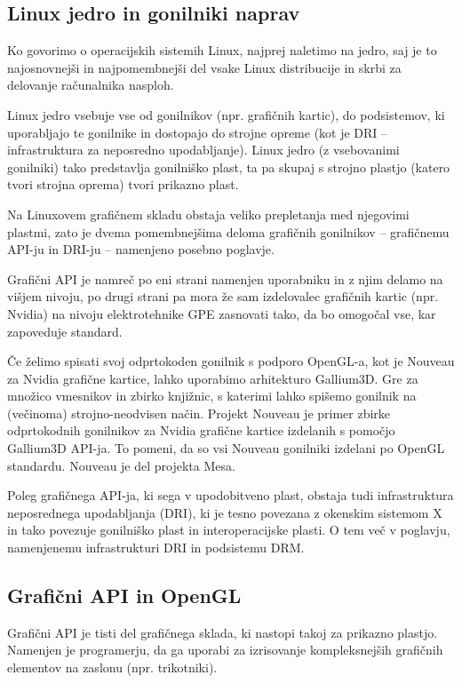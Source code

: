 \documentclass{article}
\begin{document}
\subsection{Linux jedro in gonilniki naprav}

Ko govorimo o operacijskih sistemih Linux, najprej naletimo na jedro, saj je to najosnovnejši in najpomembnejši del vsake Linux distribucije in skrbi za delovanje računalnika nasploh.

Linux jedro vsebuje vse od gonilnikov (npr. grafičnih kartic), do podsistemov, ki uporabljajo te gonilnike in dostopajo do strojne opreme (kot je DRI -- infrastruktura za neposredno upodabljanje). Linux jedro (z vsebovanimi gonilniki) tako predstavlja gonilniško plast, ta pa skupaj s strojno plastjo (katero tvori strojna oprema) tvori prikazno plast.

Na Linuxovem grafičnem skladu obstaja veliko prepletanja med njegovimi plastmi, zato je dvema pomembnejšima deloma grafičnih gonilnikov -- grafičnemu API-ju in DRI-ju -- namenjeno posebno poglavje.

Grafični API je namreč po eni strani namenjen uporabniku in z njim delamo na višjem nivoju, po drugi strani pa mora že sam izdelovalec grafičnih kartic (npr. Nvidia) na nivoju elektrotehnike GPE zasnovati tako, da bo omogočal vse, kar zapoveduje standard.

Če želimo spisati svoj odprtokoden gonilnik s podporo OpenGL-a, kot je Nouveau za Nvidia grafične kartice, lahko uporabimo arhitekturo Gallium3D. Gre za množico vmesnikov in zbirko knjižnic, s katerimi lahko spišemo gonilnik na (večinoma) strojno-neodvisen način.
Projekt Nouveau je primer zbirke odprtokodnih gonilnikov za Nvidia grafične kartice izdelanih s pomočjo Gallium3D API-ja. To pomeni, da so vsi Nouveau gonilniki izdelani po OpenGL standardu. Nouveau je del projekta Mesa.

Poleg grafičnega API-ja, ki sega v upodobitveno plast, obstaja tudi infrastruktura neposrednega upodabljanja (DRI), ki je tesno povezana z okenskim sistemom X in tako povezuje gonilniško plast in interoperacijske plasti. O tem več v poglavju, namenjenemu infrastrukturi DRI in podsistemu DRM.

\subsection{Grafični API in OpenGL}
Grafični API je tisti del grafičnega sklada, ki nastopi takoj za prikazno plastjo. Namenjen je programerju, da ga uporabi za izrisovanje kompleksnejših grafičnih elementov na zaslonu (npr. trikotniki).
\end{document}
